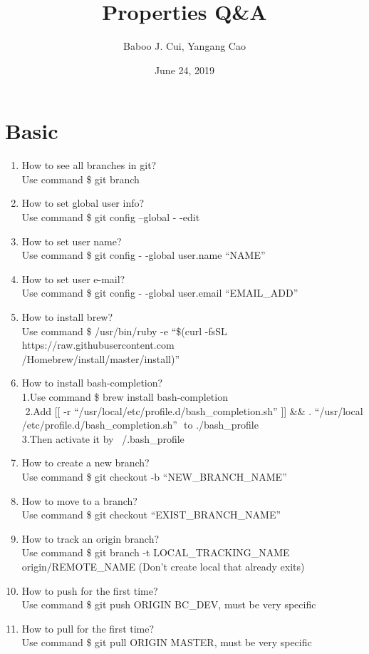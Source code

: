 \documentclass[10pt,a4paper,oneside]{article}
\date{June 24, 2019}
\author{Baboo J. Cui, Yangang Cao}
\title{Properties Q\&A}
\begin{document}
\maketitle
\tableofcontents

\newpage
\section{Basic}
\begin{enumerate}[1.]
\item    How to see all branches in git?   \\
Use command \$ git branch
\item    How to set global user info?   \\
Use command \$ git config --global - -edit
\item    How to set user name?    \\
Use command \$ git config - -global user.name “NAME”
\item   How to set user e-mail?    \\
Use command \$ git config - -global user.email “EMAIL\_ADD”
\item    How to install brew?   \\
Use command \$ /usr/bin/ruby -e ``\$(curl -fsSL https://raw.githubusercontent.com\\/Homebrew/install/master/install)''
\item    How to install bash-completion?   \\
1.Use command \$ brew install bash-completion\\ 2.Add [[ -r ``/usr/local/etc/profile.d/bash\_completion.sh'' ]] \&\& . ``/usr/local\\/etc/profile.d/bash\_completion.sh''  to ./bash\_profile \\3.Then activate it by ~/.bash\_profile
\item  How to create a new branch?     \\
Use command \$ git checkout -b “NEW\_BRANCH\_NAME”
\item   How to move to a branch?    \\
Use command \$ git checkout “EXIST\_BRANCH\_NAME”
\item   How to track an origin branch?    \\
Use command \$ git branch -t LOCAL\_TRACKING\_NAME origin/REMOTE\_NAME (Don't create local that already exits)
\item    How to push for the first time?   \\
Use command \$ git push ORIGIN BC\_DEV, must be very specific
\item    How to pull for the first time?   \\
Use command \$ git pull ORIGIN MASTER, must be very specific
\end{enumerate}
\end{document}
